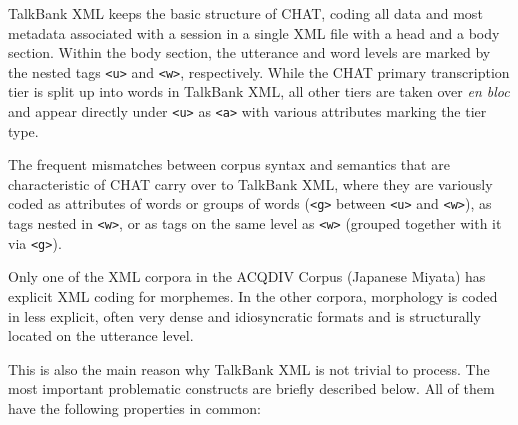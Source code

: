 \documentclass[a4paper, 11pt]{book}
\begin{document}
TalkBank XML keeps the basic structure of CHAT, coding all data and most metadata associated with a session in a single XML file with a head and a body section. Within the body section, the utterance and word levels are marked by the nested tags \texttt{<u>} and \texttt{<w>}, respectively. While the CHAT primary transcription tier is split up into words in TalkBank XML, all other tiers are taken over \emph{en bloc} and appear directly under \texttt{<u>} as \texttt{<a>} with various attributes marking the tier type.

The frequent mismatches between corpus syntax and semantics that are characteristic of CHAT carry over to TalkBank XML, where they are variously coded as attributes of words or groups of words (\texttt{<g>} between \texttt{<u>} and \texttt{<w>}), as tags nested in \texttt{<w>}, or as tags on the same level as \texttt{<w>} (grouped together with it via \texttt{<g>}).

Only one of the XML corpora in the ACQDIV Corpus (Japanese Miyata) has explicit XML coding for morphemes. In the other corpora, morphology is coded in less explicit, often very dense and idiosyncratic formats and is structurally located on the utterance level.


%
%
%
%
%

This is also the main reason why TalkBank XML is not trivial to process. The most important problematic constructs are briefly described below. All of them have the following properties in common:
\end{document}
